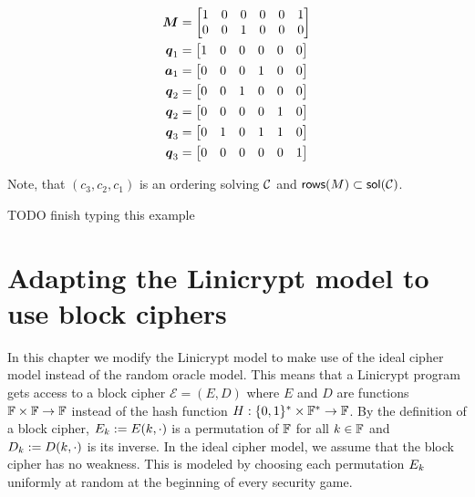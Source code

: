 \begin{align*}
\boldsymbol{M}    &= \begin{bmatrix}
            1 & 0 & 0 & 0 & 0 & 1 \\
            0 & 0 & 1 & 0 & 0 & 0 
            \end{bmatrix} \\
\boldsymbol q_1 &= \begin{bmatrix}1 & 0 & 0 & 0 & 0 & 0\end{bmatrix} \\
\boldsymbol a_1 &= \begin{bmatrix}0 & 0 & 0 & 1 & 0 & 0\end{bmatrix} \\
\boldsymbol q_2 &= \begin{bmatrix}0 & 0 & 1 & 0 & 0 & 0\end{bmatrix} \\
\boldsymbol q_2 &= \begin{bmatrix}0 & 0 & 0 & 0 & 1 & 0\end{bmatrix} \\
\boldsymbol q_3 &= \begin{bmatrix}0 & 1 & 0 & 1 & 1 & 0\end{bmatrix} \\
\boldsymbol q_3 &= \begin{bmatrix}0 & 0 & 0 & 0 & 0 & 1\end{bmatrix} \\
\end{align*}

Note, that $(c_3, c_2, c_1)$ is an ordering solving $\mathcal{C}$ and $\mathsf{rows}(M) \subset \mathsf{sol}(\mathcal{C})$.

TODO finish typing this example

\section{Adapting the Linicrypt model to use block ciphers}

In this chapter we modify the Linicrypt model to make use of the ideal cipher model instead of the random oracle model.
This means that a Linicrypt program gets access to a block cipher $\mathcal{E} = (E, D)$ where $E$ and $D$ are functions $\mathbb{F} \times \mathbb{F} \to \mathbb{F}$
instead of the hash function $H : \{0,1\}^* \times \mathbb{F}^* \to \mathbb{F}$.
By the definition of a block cipher,
$E_k := E(k, \cdot)$ is a permutation of $\mathbb{F}$ for all $k \in \mathbb{F}$ and
$D_k := D(k, \cdot)$ is its inverse.
In the ideal cipher model, we assume that the block cipher has no weakness.
This is modeled by choosing each permutation $E_k$ uniformly at random at the beginning of every security game.

